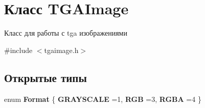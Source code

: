 \hypertarget{classTGAImage}{}\section{Класс T\+G\+A\+Image}
\label{classTGAImage}


Класс для работы с tga изображениями  




{\ttfamily \#include $<$tgaimage.\+h$>$}

\subsection*{Открытые типы}
\begin{DoxyCompactItemize}
\item 
\mbox{\label{classTGAImage_acd41e9399e944e4d5dbc3d4e8dbe199d}} 
enum {\bfseries Format} \{ {\bfseries G\+R\+A\+Y\+S\+C\+A\+LE} =1, 
{\bfseries R\+GB} =3, 
{\bfseries R\+G\+BA} =4
 \}
\end{DoxyCompactItemize}

